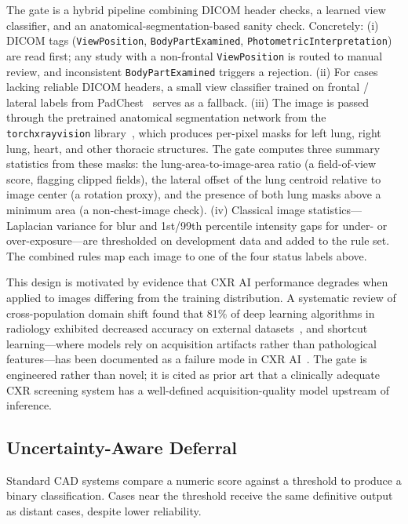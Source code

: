 \documentclass[conference, letterpaper]{IEEEtran}
\begin{document}
The gate is a hybrid pipeline combining DICOM header checks, a learned view classifier, and an anatomical-segmentation-based sanity check. Concretely: (i) DICOM tags (\texttt{ViewPosition}, \texttt{BodyPartExamined}, \texttt{PhotometricInterpretation}) are read first; any study with a non-frontal \texttt{ViewPosition} is routed to manual review, and inconsistent \texttt{BodyPartExamined} triggers a rejection. (ii) For cases lacking reliable DICOM headers, a small view classifier trained on frontal / lateral labels from PadChest~\cite{bustos2020padchest} serves as a fallback. (iii) The image is passed through the pretrained anatomical segmentation network from the \texttt{torchxrayvision} library~\cite{cohen2022torchxrayvision}, which produces per-pixel masks for left lung, right lung, heart, and other thoracic structures. The gate computes three summary statistics from these masks: the lung-area-to-image-area ratio (a field-of-view score, flagging clipped fields), the lateral offset of the lung centroid relative to image center (a rotation proxy), and the presence of both lung masks above a minimum area (a non-chest-image check). (iv) Classical image statistics---Laplacian variance for blur and 1st/99th percentile intensity gaps for under- or over-exposure---are thresholded on development data and added to the rule set. The combined rules map each image to one of the four status labels above.

This design is motivated by evidence that CXR AI performance degrades when applied to images differing from the training distribution. A systematic review of cross-population domain shift found that 81\% of deep learning algorithms in radiology exhibited decreased accuracy on external datasets~\cite{domain_shift_cxr_2025}, and shortcut learning---where models rely on acquisition artifacts rather than pathological features---has been documented as a failure mode in CXR AI~\cite{degrave2021shortcut, mongan2023review}. The gate is engineered rather than novel; it is cited as prior art that a clinically adequate CXR screening system has a well-defined acquisition-quality model upstream of inference.

\subsection{Uncertainty-Aware Deferral}

Standard CAD systems compare a numeric score against a threshold to produce a binary classification. Cases near the threshold receive the same definitive output as distant cases, despite lower reliability.
\end{document}
